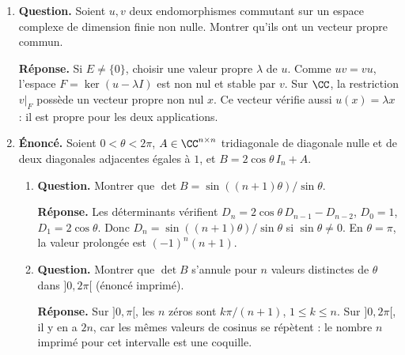 \documentclass[12pt, a4paper]{article}
\begin{document}
\begin{enumerate}[label=9.\arabic*., start=94]
\begin{minipage}[t]{\linewidth}
\begin{enumerate}[\arabic*.]
  \item \textbf{Question.} Montrer que toute valeur propre $\lambda$ vérifie $|\lambda|\leq1$.
\par\smallskip
\textbf{Réponse.} Si $Sv=\lambda v$, choisir $i$ tel que $|v_i|=\max_j|v_j|>0$.
        Alors $|\lambda||v_i|\leq\sum_j p_{i,j}|v_j|\leq|v_i|\sum_jp_{i,j}=|v_i|$.
        $\therefore|\lambda|\leq1$.

\end{enumerate}
\end{minipage}

  \item \begin{minipage}[t]{\linewidth}\raggedright
\textbf{Question.} Soient $u,v$ deux endomorphismes commutant sur un espace complexe de dimension finie non nulle. Montrer qu’ils ont un vecteur propre commun.
\par\smallskip
\textbf{Réponse.} Si $E\neq\{0\}$, choisir une valeur propre $\lambda$ de $u$.
    Comme $uv=vu$, l'espace $F=\ker(u-\lambda I)$ est non nul et stable par $v$.
    Sur $\CC$, la restriction $v|_F$ possède un vecteur propre non nul $x$.
    Ce vecteur vérifie aussi $u(x)=\lambda x$ : il est propre pour les deux applications.
\end{minipage}

  \item \begin{minipage}[t]{\linewidth}\raggedright
\textbf{Énoncé.} Soient $0<\theta<2\pi$, $A\in\CC^{n\times n}$ tridiagonale de diagonale nulle et de deux diagonales adjacentes égales à $1$, et $B=2\cos\theta\,I_n+A$.

\begin{enumerate}[\arabic*.]
        \item \textbf{Question.} Montrer que $\det B=\sin((n+1)\theta)/\sin\theta$.
\par\smallskip
\textbf{Réponse.} Les déterminants vérifient $D_n=2\cos\theta\,D_{n-1}-D_{n-2}$, $D_0=1$, $D_1=2\cos\theta$.
        Donc $D_n=\sin((n+1)\theta)/\sin\theta$ si $\sin\theta\neq0$.
        En $\theta=\pi$, la valeur prolongée est $(-1)^n(n+1)$.

  \item \textbf{Question.} Montrer que $\det B$ s’annule pour $n$ valeurs distinctes de $\theta$ dans $]0,2\pi[$ (énoncé imprimé).
\par\smallskip
\textbf{Réponse.} Sur $]0,\pi[$, les $n$ zéros sont $k\pi/(n+1)$, $1\leq k\leq n$.
        Sur $]0,2\pi[$, il y en a $2n$, car les mêmes valeurs de cosinus se répètent : le nombre $n$ imprimé pour cet intervalle est une coquille.


\end{enumerate}
\end{minipage}
\end{enumerate}
\end{document}
